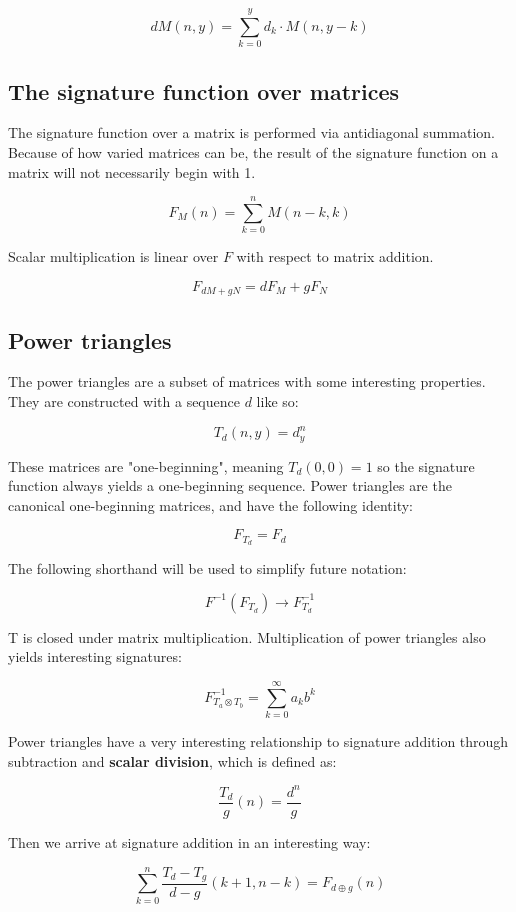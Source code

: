 \documentclass{article}
\begin{document}
$$ dM(n, y) = \sum_{k=0}^{y} d_k \cdot M(n, y-k) $$

\subsection{The signature function over matrices}

\noindent The signature function over a matrix is performed via antidiagonal summation. Because of how varied matrices can be, the result of the signature function on a matrix will not necessarily begin with 1.

$$ F_M (n) = \sum_{k=0}^{n} M(n-k, k) $$

\noindent Scalar multiplication is linear over $F$ with respect to matrix addition.

$$ F_{dM + gN} = dF_M + gF_N$$

\subsection{Power triangles}

\noindent The power triangles are a subset of matrices with some interesting properties. They are constructed with a sequence $d$ like so:

$$ T_d (n, y) = d_y^n$$

\noindent These matrices are "one-beginning", meaning $T_d(0, 0) = 1$ so the signature function always yields a one-beginning sequence. Power triangles are the canonical one-beginning matrices, and have the following identity:

$$ F_{T_d} = F_d$$

\noindent The following shorthand will be used to simplify future notation:

$$F^{-1}(F_{T_d}) \rightarrow F^{-1}_{T_d}$$

\noindent  T is closed under matrix multiplication. Multiplication of power triangles also yields interesting signatures:

$$ F^{-1}_{T_a \otimes T_b} = \sum_{k=0}^{\infty} a_k b^k$$

\noindent Power triangles have a very interesting relationship to signature addition through subtraction and \textbf{scalar division}, which is defined as:

$$\frac{T_d}{g} (n) = \frac{d^n}{g} $$

\noindent Then we arrive at signature addition in an interesting way:

$$\sum_{k=0}^{n} \frac{T_d - T_g}{d - g} (k + 1, n-k) = F_{d \oplus g} (n)$$
\end{document}
